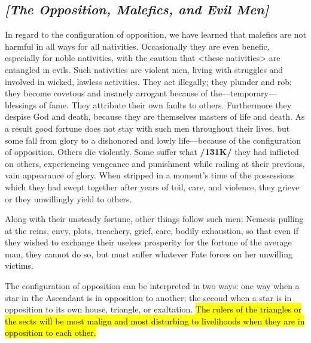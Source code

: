 \subsection{\textit{[The Opposition, Malefics, and Evil Men]}}
In  regard to the configuration of opposition, we have learned that malefics are not harmful in all ways for all nativities. Occasionally they are even benefic, especially for noble nativities, with the caution that <these nativities> are entangled in evils. Such nativities are violent men, living with struggles and involved in wicked, lawless activities. They act illegally; they plunder and rob; they become covetous and insanely arrogant because of the—temporary—blessings of fame. They attribute their own faults to others. Furthermore they despise God and death, because they are themselves masters of life and death. As a result good fortune does not stay with such men throughout their lives, but some fall from glory to a dishonored and lowly life—because of the configuration of opposition. Others die violently. Some suffer what \textbf{/131K/} they had inflicted on others, experiencing vengeance and punishment while railing at their previous, vain appearance of glory. When stripped in a moment’s time of the possessions which they had swept together
after years of toil, care, and violence, they grieve or they unwillingly yield to others. 

Along with their unsteady fortune, other things follow such men: Nemesis pulling at the reins, envy, plots, treachery, grief, care, bodily exhaustion, so that even if they wished to exchange their useless prosperity for the fortune of the average man, they cannot do so, but must suffer whatever Fate forces on her unwilling victims. 

The configuration of opposition can be interpreted in two ways: one way when a star in the Ascendant is in opposition to another; the second when a star is in opposition to its own house, triangle, or exaltation. \hl{The rulers of the triangles or the sects will be most malign and most disturbing to livelihoods when they are in opposition to each other.}

\newpage